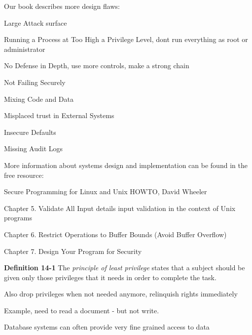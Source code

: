 \documentclass[Screen16to9,17pt]{foils}
\begin{document}
Our book describes more design flaws:
\begin{list2}
\item Large Attack surface
\item Running a Process at Too High a Privilege Level, dont run everything as root or administrator
\item No Defense in Depth, use more controls, make a strong chain
\item Not Failing Securely
\item Mixing Code and Data
\item Misplaced trust in External Systems
\item Insecure Defaults
\item Missing Audit Logs
\end{list2}


\begin{list1}
\item More information about systems design and implementation can be found in the free resource:
\item Secure Programming for Linux and Unix HOWTO, David Wheeler
\item {}
\item Chapter 5. Validate All Input details input validation in the context of Unix programs
\item Chapter 6. Restrict Operations to Buffer Bounds (Avoid Buffer Overflow)
\item Chapter 7. Design Your Program for Security
\end{list1}



\begin{list1}
\item {\bf Definition 14-1} The \emph{principle of least privilege} states that a subject should be given only those privileges that it needs in order to complete the task.
\item Also drop privileges when not needed anymore, relinquish rights immediately
\item Example, need to read a document - but not write.
\item Database systems can often provide very fine grained access to data
\end{list1}


\end{document}
